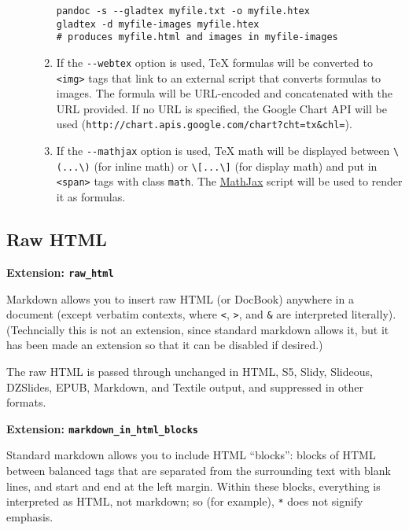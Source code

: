 \documentclass[]{article}
\begin{document}
\begin{description}
\begin{enumerate}
\begin{verbatim}
pandoc -s --gladtex myfile.txt -o myfile.htex
gladtex -d myfile-images myfile.htex
# produces myfile.html and images in myfile-images
\end{verbatim}
\item
  If the \texttt{-{}-webtex} option is used, TeX formulas will be
  converted to \texttt{\textless{}img\textgreater{}} tags that link to
  an external script that converts formulas to images. The formula will
  be URL-encoded and concatenated with the URL provided. If no URL is
  specified, the Google Chart API will be used
  (\texttt{http://chart.apis.google.com/chart?cht=tx\&chl=}).
\item
  If the \texttt{-{}-mathjax} option is used, TeX math will be displayed
  between \texttt{\textbackslash{}(...\textbackslash{})} (for inline
  math) or \texttt{\textbackslash{}{[}...\textbackslash{}{]}} (for
  display math) and put in \texttt{\textless{}span\textgreater{}} tags
  with class \texttt{math}. The \href{http://www.mathjax.org/}{MathJax}
  script will be used to render it as formulas.
\end{enumerate}
\end{description}

\subsection{Raw HTML}

\textbf{Extension: \texttt{raw\_html}}

Markdown allows you to insert raw HTML (or DocBook) anywhere in a
document (except verbatim contexts, where \texttt{\textless{}},
\texttt{\textgreater{}}, and \texttt{\&} are interpreted literally).
(Techncially this is not an extension, since standard markdown allows
it, but it has been made an extension so that it can be disabled if
desired.)

The raw HTML is passed through unchanged in HTML, S5, Slidy, Slideous,
DZSlides, EPUB, Markdown, and Textile output, and suppressed in other
formats.

\textbf{Extension: \texttt{markdown\_in\_html\_blocks}}

Standard markdown allows you to include HTML ``blocks'': blocks of HTML
between balanced tags that are separated from the surrounding text with
blank lines, and start and end at the left margin. Within these blocks,
everything is interpreted as HTML, not markdown; so (for example),
\texttt{*} does not signify emphasis.
\end{document}
